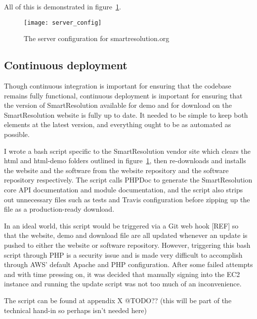 All of this is demonstrated in figure~\ref{uml:serverConfig}.

\begin{figure}[h!]
  \centering
    \ifimages
    \texttt{[image: server\_config]}
    \fi
  \caption{The server configuration for smartresolution.org}
  \label{uml:serverConfig}
\end{figure}

\subsection{Continuous deployment}

Though continuous integration is important for ensuring that the codebase remains fully functional, continuous deployment is important for ensuring that the version of SmartResolution available for demo and for download on the SmartResolution website is fully up to date. It needed to be simple to keep both elements at the latest version, and everything ought to be as automated as possible.

I wrote a bash script specific to the SmartResolution vendor site which clears the html and html-demo folders outlined in figure~\ref{uml:serverConfig}, then re-downloads and installs the website and the software from the website repository and the software repository respectively. The script calls PHPDoc to generate the SmartResolution core API documentation and module documentation, and the script also strips out unnecessary files such as tests and Travis configuration before zipping up the file as a production-ready download.

In an ideal world, this script would be triggered via a Git web hook [REF] so that the website, demo and download file are all updated whenever an update is pushed to either the website or software repository. However, triggering this bash script through PHP is a security issue and is made very difficult to accomplish through AWS' default Apache and PHP configuration. After some failed attempts and with time pressing on, it was decided that manually signing into the EC2 instance and running the update script was not too much of an inconvenience.

The script can be found at appendix X @TODO?? (this will be part of the technical hand-in so perhaps isn't needed here)